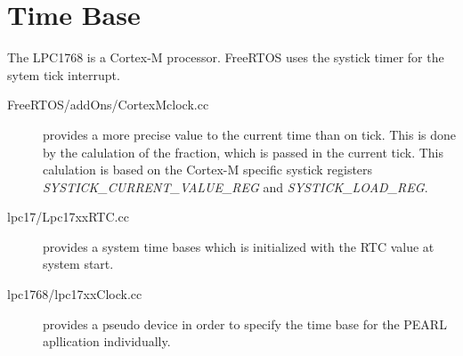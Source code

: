\section{Time Base}
The LPC1768 is a Cortex-M processor. FreeRTOS uses the systick timer 
for the sytem tick interrupt. 
\begin{description}
\item[FreeRTOS/addOns/CortexMclock.cc] provides a more precise value to
 the current time than on tick.
This is done
by the calulation of the fraction, which is passed in the current tick.
This calulation is based on the Cortex-M specific systick registers
{\em SYSTICK\_CURRENT\_VALUE\_REG} and {\em SYSTICK\_LOAD\_REG}.
\item[lpc17/Lpc17xxRTC.cc] provides a system time bases which is 
initialized with the RTC value at system start.
\item[lpc1768/lpc17xxClock.cc] provides a pseudo device in order
   to specify the time base for the PEARL apllication individually.
\end{description}
